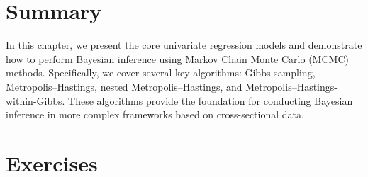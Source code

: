 \section{Summary}\label{sec611}
In this chapter, we present the core univariate regression models and demonstrate how to perform Bayesian inference using Markov Chain Monte Carlo (MCMC) methods. Specifically, we cover several key algorithms: Gibbs sampling, Metropolis–Hastings, nested Metropolis–Hastings, and Metropolis–Hastings-within-Gibbs. These algorithms provide the foundation for conducting Bayesian inference in more complex frameworks based on cross-sectional data.

\section{Exercises}\label{sec612}

